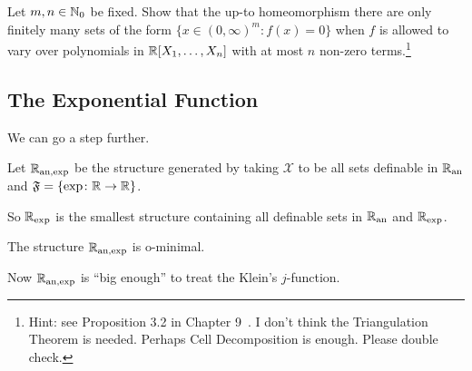 \begin{exercise}
  Let $m,n\in{\mathbb{N}}_0$ be fixed. Show that the up-to homeomorphism there
  are only finitely many sets of the form
  $\{x\in (0,\infty)^m : f(x) =0\}$ when $f$ is allowed to vary over
  polynomials in ${\mathbb{R}}[X_1,\ldots,X_n]$ with at most $n$ non-zero
  terms.\footnote{Hint: see Proposition 3.2 in Chapter
    9~\cite{D:oMin}. I don't think the Triangulation Theorem is
    needed. Perhaps Cell Decomposition is enough. Please double check.}
\end{exercise}

\subsection{The Exponential Function}
We can go a step further.

\begin{definition}
  Let ${{\mathbb{R}}_{\mathrm{an,exp}}}$ be the structure generated by taking $\mathscr{X}$ to
  be all sets definable in ${{\mathbb{R}}_{\mathrm{an}}}$
  and $\mathfrak{F} = \{ \exp \colon {\mathbb{R}}\rightarrow{\mathbb{R}}\}$. 
\end{definition}

So ${{\mathbb{R}}_{\mathrm{exp}}}$ is the smallest structure containing all definable sets in
${{\mathbb{R}}_{\mathrm{an}}}$ and ${{\mathbb{R}}_{\mathrm{exp}}}$.

\begin{theorem}
  The structure ${{\mathbb{R}}_{\mathrm{an,exp}}}$ is o-minimal.
\end{theorem}

Now ${{\mathbb{R}}_{\mathrm{an,exp}}}$ is ``big enough'' to treat the Klein's
$j$-function. 

